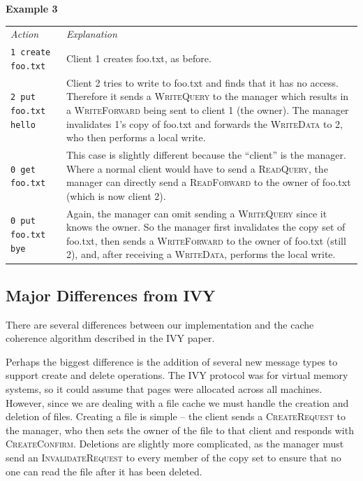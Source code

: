 \documentclass[12pt]{article}	%
\begin{document}
\pagebreak

\begin{center} \textbf{Example 3} \end{center}

\begin{tabular}{p{1.7in}|p{3.3in}}
\emph{Action} & \emph{Explanation} \\
\texttt{1 create foo.txt} & Client 1 creates foo.txt, as before. \\
\texttt{2 put foo.txt hello} & Client 2 tries to write to foo.txt and finds that it has no access. Therefore it sends a \textsc{WriteQuery} to the manager which results in a \textsc{WriteForward} being sent to client 1 (the owner). The manager invalidates 1's copy of foo.txt and forwards the \textsc{WriteData} to 2, who then performs a local write. \\
\texttt{0 get foo.txt} & This case is slightly different because the ``client'' is the manager. Where a normal client would have to send a \textsc{ReadQuery}, the manager can directly send a \textsc{ReadForward} to the owner of foo.txt (which is now client 2). \\
\texttt{0 put foo.txt bye} & Again, the manager can omit sending a \textsc{WriteQuery} since it knows the owner. So the manager first invalidates the copy set of foo.txt, then sends a \textsc{WriteForward} to the owner of foo.txt (still 2), and, after receiving a \textsc{WriteData}, performs the local write. \\
\end{tabular}

\subsection{Major Differences from IVY}

There are several differences between our implementation and the cache coherence algorithm described in the IVY paper.

Perhaps the biggest difference is the addition of several new message types to support create and delete operations. The IVY protocol was for virtual memory systems, so it could assume that pages were allocated across all machines. However, since we are dealing with a file cache we must handle the creation and deletion of files. Creating a file is simple -- the client sends a \textsc{CreateRequest} to the manager, who then sets the owner of the file to that client and responds with \textsc{CreateConfirm}. Deletions are slightly more complicated, as the manager must send an \textsc{InvalidateRequest} to every member of the copy set to ensure that no one can read the file after it has been deleted.
\end{document}
